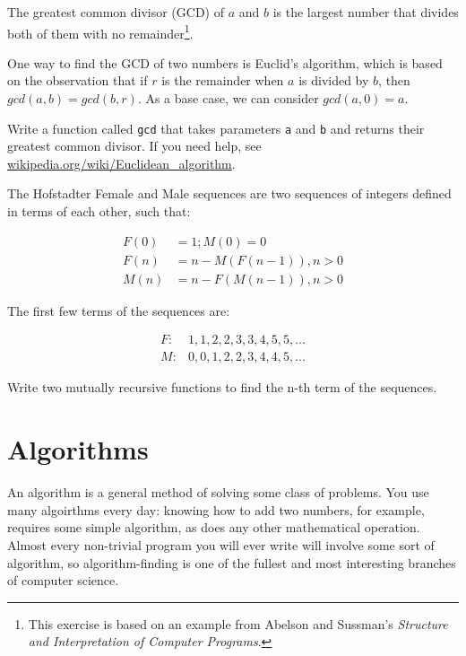 \documentclass[10pt]{book}
\begin{document}
\begin{ex}


The greatest common divisor (GCD) of $a$ and $b$ is the largest number
that divides both of them with no remainder\footnote{This exercise is
  based on an example from Abelson and Sussman's {\em Structure and
    Interpretation of Computer Programs}.}.

One way to find the GCD of two numbers is Euclid's algorithm,
which is based on the observation that if $r$ is the remainder
when $a$ is divided by $b$, then $gcd(a, b) = gcd(b, r)$.
As a base case, we can consider $gcd(a, 0) = a$.


Write a function called
\verb"gcd" that takes parameters {\tt a} and {\tt b}
and returns their greatest common divisor.  If you need
help, see \url{wikipedia.org/wiki/Euclidean_algorithm}.

\end{ex}

\begin{ex}

The Hofstadter Female and Male sequences are two sequences of integers
defined in terms of each other, such that:

\begin{align*}
F(0) &= 1; M(0) = 0 \\
F(n) &= n - M(F(n-1)), n>0 \\
M(n) &= n - F(M(n-1)), n>0
\end{align*}

The first few terms of the sequences are:

\begin{align*}
F:& 1, 1, 2, 2, 3, 3, 4, 5, 5,... \\
M:& 0, 0, 1, 2, 2, 3, 4, 4, 5,... 
\end{align*}

Write two mutually recursive functions to find the n-th term of the 
sequences.

\end{ex}

\chapter{Algorithms}

An algorithm is a general method of solving some class of problems. You use many algoirthms every day: knowing how to add two numbers, for example, requires some simple algorithm, as does any other mathematical operation. Almost every non-trivial program you will ever write will involve some sort of algorithm, so algorithm-finding is one of the fullest and most interesting branches of computer science.
\end{document}
